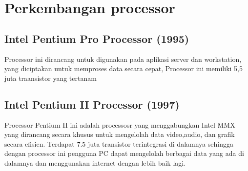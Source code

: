 \section{Perkembangan processor}
	\subsection{Intel Pentium Pro Processor (1995)}
		Processor ini dirancang untuk digunakan pada aplikasi server dan workstation, yang diciptakan untuk memproses data secara cepat, Processor ini memiliki 5,5 juta traansistor yang tertanam
	\subsection{Intel Pentium II Processor (1997)}	
		Processor Pentium II ini adalah processosr yang menggabungkan Intel MMX yang dirancang secara khusus untuk mengelolah data video,audio, dan grafik secara efisien. Terdapat 7.5 juta transistor terintegrasi di dalamnya sehingga dengan processor ini pengguna PC dapat mengelolah berbagai data yang ada di dalamnya dan menggunakan internet dengan lebih baik lagi.